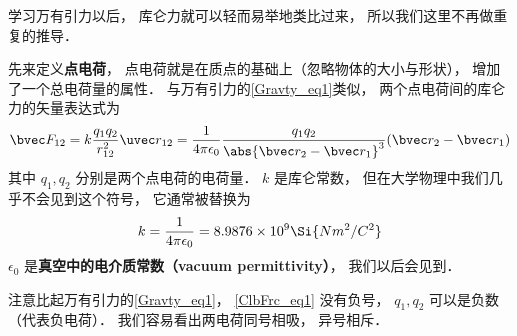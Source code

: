

学习万有引力以后， 库仑力就可以轻而易举地类比过来， 所以我们这里不再做重复的推导．

先来定义\textbf{点电荷}， 点电荷就是在质点的基础上（忽略物体的大小与形状）， 增加了一个总电荷量的属性． 与万有引力的\autoref{Gravty_eq1}类似， 两个点电荷间的库仑力的矢量表达式为
\begin{equation}\label{ClbFrc_eq1}
\bvec F_{12} = k\frac{q_1 q_2}{r_{12}^2} \uvec r_{12} = \frac{1}{4\pi\epsilon_0} \frac{q_1 q_2}{\abs{\bvec r_2 - \bvec r_1}^3}(\bvec r_2 - \bvec r_1)
\end{equation}
其中 $q_1, q_2$ 分别是两个点电荷的电荷量． $k$ 是库仑常数， 但在大学物理中我们几乎不会见到这个符号， 它通常被替换为
\begin{equation}
k = \frac{1}{4\pi\epsilon_0} = 8.9876\times 10^9 \Si{N m^2/C^2}
\end{equation}
$\epsilon_0$ 是\textbf{真空中的电介质常数（vacuum permittivity）}， 我们以后会见到．

注意比起万有引力的\autoref{Gravty_eq1}， \autoref{ClbFrc_eq1} 没有负号， $q_1, q_2$ 可以是负数（代表负电荷）． 我们容易看出两电荷同号相吸， 异号相斥．
